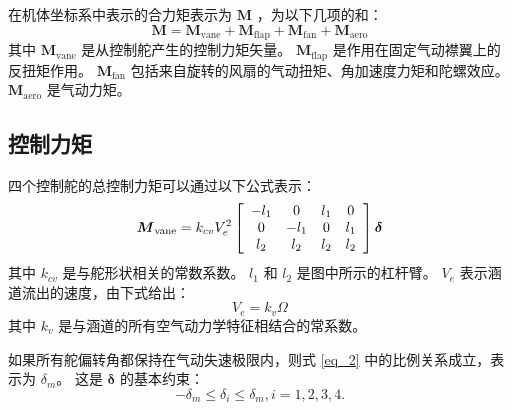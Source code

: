 在机体坐标系中表示的合力矩表示为 $\boldsymbol M$ ，为以下几项的和：
\begin{equation}
	{\boldsymbol{M}} = {{\boldsymbol{M}}_\text{vane}} + \boldsymbol{M}_{\text{flap}} + {\boldsymbol{M}}_{\text{fan}} + {\boldsymbol{M}}_{\text{aero}}
	\label{eq_1}
\end{equation}
其中 $ {{\boldsymbol{M}}_\text{vane}} $ 是从控制舵产生的控制力矩矢量。 $ \boldsymbol{M}_{\text{flap}} $ 是作用在固定气动襟翼上的反扭矩作用。 $ {\boldsymbol{M}}_{\text{fan}} $ 包括来自旋转的风扇的气动扭矩、角加速度力矩和陀螺效应。 $  {\boldsymbol{M}}_{\text{aero}} $ 是气动力矩。

\subsection{控制力矩}
四个控制舵的总控制力矩可以通过以下公式表示：
\begin{equation}
{{\boldsymbol{M}}_\text{vane}} = {k_{cv}}V_e^2\left[ {\begin{array}{*{20}{c}}
	{{\rm{ - }}{l_1}}&0&{{l_1}}&0\\
	0&{{\rm{ - }}{l_1}}&0&{{l_1}}\\
	{{l_2}}&{{l_2}}&{{l_2}}&{{l_2}}
	\end{array}} \right]{\boldsymbol{\delta }}
\label{eq_2}
\end{equation}
其中 $ {{k}_{cv}} $ 是与舵形状相关的常数系数。 $ {{l}_{1}} $ 和 $ {{l}_{2}} $ 是图中所示的杠杆臂。 ${{V}_{e}}$ 表示涵道流出的速度，由下式给出：
\begin{equation}
	{V_e} = {k_v}\Omega 
	\label{eq_3}
\end{equation}
其中 $ {{k}_{v}} $ 是与涵道的所有空气动力学特征相结合的常系数。 

如果所有舵偏转角都保持在气动失速极限内，则式 \eqref{eq_2} 中的比例关系成立，表示为 $ {{\delta }_{m}} $。 这是 ${\boldsymbol \delta}$ 的基本约束：
\begin{equation} 
	- {\delta _m} \le {\delta _i} \le {\delta _m},   i = 1,2,3,4.
	\label{eq_4}
\end{equation}

